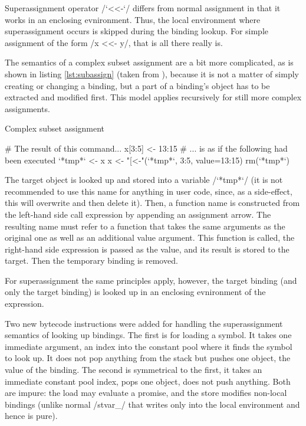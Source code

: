 Superassignment operator \rinline/`<<-`/ differs from normal assignment in that it works in an enclosing evnironment. Thus, the local environment where superassignment occurs is skipped during the binding lookup. For simple assignment of the form \rinline/x <<- y/, that is all there really is.

The semantics of a complex subset assignment are a bit more complicated, as is shown in listing \ref{lst:subassign} (taken from \autocite{subset}), because it is not a matter of simply creating or changing a binding, but a part of a binding's object has to be extracted and modified first. This model applies recursively for still more complex assignments.

\begin{listing}[htbp]
  \caption{\label{lst:subassign}Complex subset assignment}
  \begin{rcode}
# The result of this command...
x[3:5] <- 13:15
# ... is as if the following had been executed
`*tmp*` <- x
x <- "[<-"(`*tmp*`, 3:5, value=13:15)
rm(`*tmp*`)
  \end{rcode}
\end{listing}

The target object is looked up and stored into a variable \rinline/`*tmp*`/ (it is not recommended to use this name for anything in user code, since, as a side-effect, this will overwrite and then delete it). Then, a function name is constructed from the left-hand side call expression by appending an assignment arrow. The resulting name must refer to a function that takes the same arguments as the original one as well as an additional value argument. This function is called, the right-hand side expression is passed as the value, and its result is stored to the target. Then the temporary binding is removed.

For superassignment the same principles apply, however, the target binding (and only the target binding) is looked up in an enclosing evnironment of the expression.

Two new bytecode instructions were added for handling the superassignment semantics of looking up bindings. The first is for loading a symbol. It takes one immediate argument, an index into the constant pool where it finds the symbol to look up. It does not pop anything from the stack but pushes one object, the value of the binding. The second is symmetrical to the first, it takes an immediate constant pool index, pops one object, does not push anything. Both are impure: the load may evaluate a promise, and the store modifies non-local bindings (unlike normal \cinline/stvar_/ that writes only into the local environment and hence is pure).

